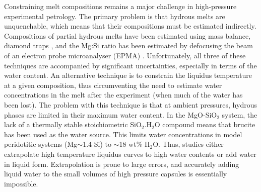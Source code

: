 \documentclass[review]{elsarticle}
\begin{document}


Constraining melt compositions remains a major challenge in high-pressure experimental petrology. The primary problem is that hydrous melts are unquenchable, which means that their compositions must be estimated indirectly. Compositions of partial hydrous melts have been estimated using mass balance, diamond traps \citep{MSUP2007}, and the Mg:Si ratio has been estimated by defocusing the beam of an electron probe microanalyser (EPMA) \citep[e.g.][]{YII2004}. Unfortunately, all three of these techniques are accompanied by significant uncertainties, especially in terms of the water content. An alternative technique is to constrain the liquidus temperature at a given composition, thus circumventing the need to estimate water concentrations in the melt after the experiment (when much of the water has been lost). The problem with this technique is that at ambient pressures, hydrous phases are limited in their maximum water content. In the MgO-SiO$_2$ system, the lack of a thermally stable stoichiometric SiO$_2$.H$_2$O compound means that brucite has been used as the water source. This limits water concentrations in model peridotitic systems (Mg$\sim$1.4 Si) to $\sim$18 wt\% H$_2$O. Thus, studies either extrapolate high temperature liquidus curves to high water contents or add water in liquid form. Extrapolation is prone to large errors, and accurately adding liquid water to the small volumes of high pressure capsules is essentially impossible. 
\end{document}
